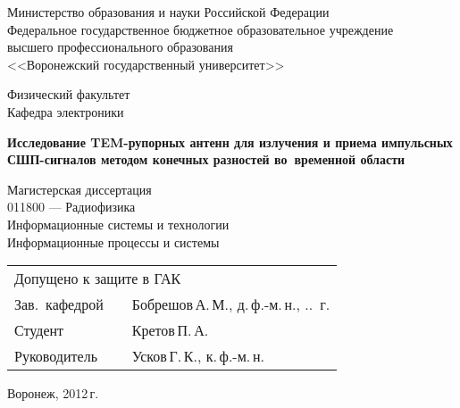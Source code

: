 %
%

\begin{titlepage}
\centering
Министерство образования и науки Российской Федерации\\
Федеральное государственное бюджетное образовательное учреждение\\
высшего профессионального образования\\
<<Воронежский государственный университет>>\\

\vspace{10mm}

Физический факультет\\
Кафедра электроники

\vspace{50mm}

\textbf{
    Исследование TEM-рупорных антенн для излучения и приема импульсных
    СШП-сигналов методом конечных разностей во~временной области}

\vspace{10mm}
Магистерская диссертация\\
\vspace{10mm}
011800 --- Радиофизика\\
Информационные системы и технологии\\
Информационные процессы и системы\\

\vspace{20mm}
\begin{tabularx}{\textwidth}{lll}
\multicolumn{3}{l}{Допущено к защите в ГАК} \\[5mm]
Зав.~кафедрой & \hspace{35mm} & Бобрешов\,А.\,М., д.\,ф.-м.\,н.,
\underline{\hspace{5mm}}.\underline{\hspace{5mm}}.\underline{\hspace{10mm}}~г.\\
Студент       & \hspace{35mm} & Кретов\,П.\,А.\\
Руководитель  & \hspace{35mm} & Усков\,Г.\,К., к.\,ф.-м.\,н.\\
\end{tabularx}

\vspace*{\fill}

Воронеж, 2012\,г.
\end{titlepage}
\setcounter{page}{2}
